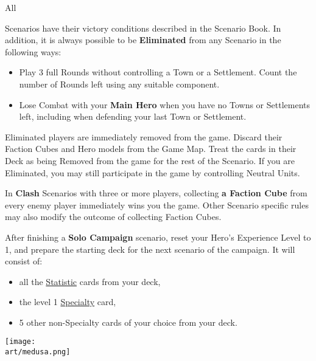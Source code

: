 
\begin{multicols*}{2}

\hypertarget{End}{All} Scenarios have their victory conditions described in the Scenario Book.
In addition, it is always possible to be \textbf{Eliminated} from any Scenario in the following ways:
\begin{itemize}
  \item Play 3 full Rounds without controlling a Town or a Settlement.
    Count the number of Rounds left using any suitable component.
  \item Lose Combat with your \textbf{Main Hero} when you have no Towns or Settlements left, including when defending your last Town or Settlement.
\end{itemize}
Eliminated players are immediately removed from the game.
Discard their Faction Cubes and Hero models from the Game Map.
Treat the cards in their Deck as being Removed from the game for the rest of the Scenario.
If you are Eliminated, you may still participate in the game by controlling Neutral Units.\par
{}\par

\columnbreak

In \textbf{Clash} Scenarios with three or more players, collecting \textbf{a Faction Cube} from every enemy player immediately wins you the game.
Other Scenario specific rules may also modify the outcome of collecting Faction Cubes.

After finishing a \textbf{Solo Campaign} scenario, reset your Hero's Experience Level to 1, and prepare the starting deck for the next scenario of the campaign.
It will consist of:
\begin{itemize}
  \item all the \hyperlink{Ability}{Statistic} cards from your deck,
  \item the level 1 \hyperlink{Specialty}{Specialty} card,
  \item 5 other non-Specialty cards of your choice from your deck.
\end{itemize}

\vspace*{\fill}
\hspace{-6em}
\texttt{[image: \\art/medusa.png]}

\end{multicols*}
